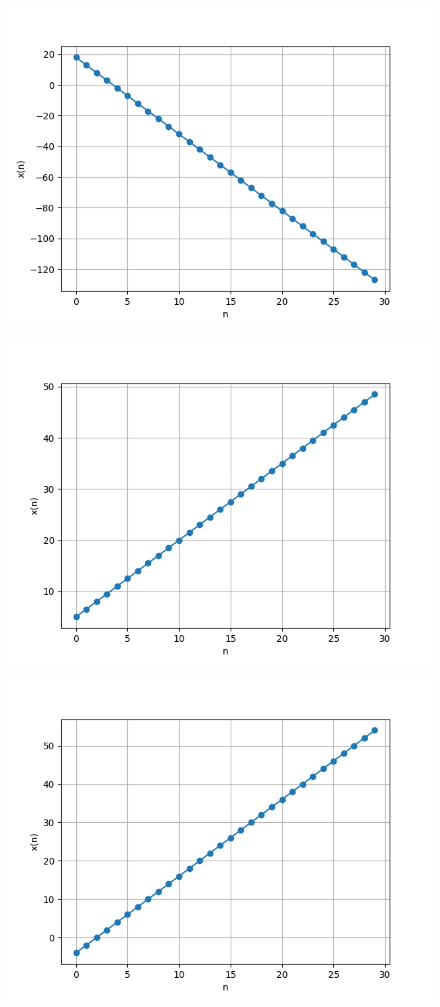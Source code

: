 \documentclass[journal,12pt,twocolumn]{IEEEtran}
\theoremstyle{remark}
\begin{document}
\begin{figure}[h]
      \vspace*{-1cm}
      \centering
       \includegraphics[width=0.8\linewidth]{figs/download (1).png} %
        \caption{}
    \end{figure}
    
\begin{figure}[h]
      \vspace*{-2cm}
      \centering
       \includegraphics[width=0.8\linewidth]{figs/download (2).png} %
        \caption{}
    \end{figure}
    
\begin{figure}[h]
      \vspace*{-2cm} 
      \centering
       \includegraphics[width=0.8\linewidth]{figs/download (3).png} %
        \caption{}
    \end{figure}
    
\end{document}
